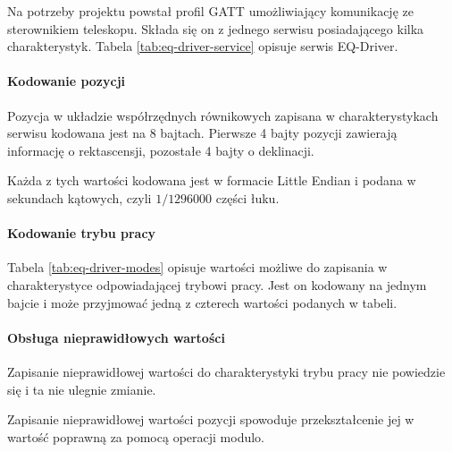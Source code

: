 Na potrzeby projektu powstał profil GATT umożliwiający komunikację ze
sterownikiem teleskopu. Składa się on z jednego serwisu posiadającego kilka
charakterystyk. Tabela \ref{tab:eq-driver-service} opisuje serwis EQ-Driver.

\paragraph{Kodowanie pozycji} Pozycja w układzie współrzędnych równikowych
zapisana w charakterystykach serwisu kodowana jest na 8 bajtach. Pierwsze
4 bajty pozycji zawierają informację o rektascensji, pozostałe 4 bajty
o deklinacji.

Każda z tych wartości kodowana jest w formacie Little Endian i podana
w sekundach kątowych, czyli $1/1296000$ części łuku.

\paragraph{Kodowanie trybu pracy} Tabela \ref{tab:eq-driver-modes} opisuje
wartości możliwe do zapisania w charakterystyce odpowiadającej trybowi pracy.
Jest on kodowany na jednym bajcie i może przyjmować jedną z czterech wartości
podanych w tabeli.

\paragraph{Obsługa nieprawidłowych wartości} Zapisanie nieprawidłowej wartości
do charakterystyki trybu pracy nie powiedzie się i ta nie ulegnie zmianie.

Zapisanie nieprawidłowej wartości pozycji spowoduje przekształcenie jej
w wartość poprawną za pomocą operacji modulo.
